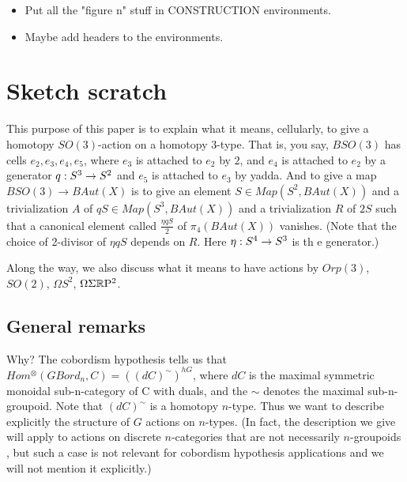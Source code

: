 \documentclass{amsart}
\begin{document}
\begin{itemize}
\item Put all the "figure n" stuff in CONSTRUCTION environments.
\item Maybe add headers to the environments.
\end{itemize}

\section*{Sketch scratch}

This purpose of this paper is to explain what it means, cellularly, to give a homotopy $SO(3)$-action on a homotopy 3-type.  That is, you say, $BSO(3)$ has cells $e_2, e_3, e_4, e_5$, where $e_3$ is attached to $e_2$ by $2$, and $e_4$ is attached to $e_2$ by a generator $q: S^3 \rightarrow S^2$ and $e_5$ is attached to $e_3$ by yadda.  And to give a map $BSO(3) \rightarrow BAut(X)$ is to give an element $S \in Map(S^2,BAut(X))$ and a trivialization $A$ of $q S \in Map(S^3,BAut(X))$ and a trivialization $R$ of $2S$ such that a canonical element called $\frac{\eta q S}{2}$ of $\pi_4(BAut(X))$ vanishes.  (Note that the choice of 2-divisor of $\eta q S$ depends on $R$.  Here $\eta: S^4 \rightarrow S^3$ is th 	e generator.)

Along the way, we also discuss what it means to have actions by $Orp(3)$, $SO(2)$, $\Omega S^2$, $\Omega \Sigma \mathbb R \mathrm{P}^2$.


\subsection{General remarks}

Why? The cobordism hypothesis tells us that $Hom^{\otimes}(GBord_n,C) = ((dC)^{\sim})^{hG}$, where $dC$ is the maximal symmetric monoidal sub-n-category of C with duals, and the $\sim$ denotes the maximal sub-n-groupoid.  Note that $(dC)^\sim$ is a homotopy $n$-type.  Thus we want to describe explicitly the structure of $G$ actions on $n$-types.  (In fact, the description we give will apply to actions on discrete $n$-categories that are not necessarily $n$-groupoids , but such a case is not relevant for cobordism hypothesis applications and we will not mention it explicitly.)
\end{document}
